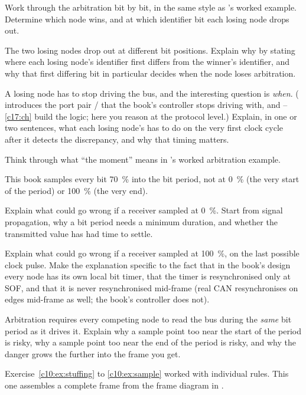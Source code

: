  Work through the arbitration bit by bit, in the same style as
's worked example. Determine which node wins, and at which identifier bit
each losing node drops out.

 The two losing nodes drop out at different bit positions. Explain why by stating where each
losing node's identifier first differs from the winner's identifier, and why that first differing bit
in particular decides when the node loses arbitration.

 A losing node has to stop driving the bus, and the interesting question is \emph{when}.
( introduces the port pair / that the book's controller
stops driving with, and --\ref{c17:ch} build the logic; here you reason at the
protocol level.) Explain, in one or two sentences, what each losing node's  has
to do on the very first clock cycle after it detects the discrepancy, and why that timing matters.

\note[Clue]Think through what ``the moment'' means in 's worked
arbitration example.

\label{c10:ex:sample}
This book samples every bit 70~\% into the bit period, not at 0~\% (the very start of the period) or
100~\% (the very end).

 Explain what could go wrong if a receiver sampled at 0~\%. Start from signal propagation,
why a bit period needs a minimum duration, and whether the transmitted value has had time to settle.

 Explain what could go wrong if a receiver sampled at 100~\%, on the last possible clock
pulse. Make the explanation specific to the fact that in the book's design every node has its own
local bit timer, that the timer is resynchronised only at SOF, and that it is never resynchronised
mid-frame (real CAN resynchronises on edges mid-frame as well; the book's controller does not).

 Arbitration requires every competing node to read the bus during the \emph{same} bit period
as it drives it. Explain why a sample point too near the start of the period is risky, why a sample
point too near the end of the period is risky, and why the danger grows the further into the frame
you get.

\label{c10:ex:frame}
Exercise~\ref{c10:ex:stuffing} to \ref{c10:ex:sample} worked with individual rules. This one
assembles a complete frame from the frame diagram in .

